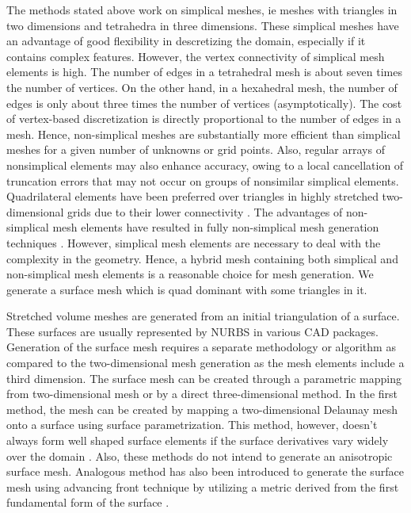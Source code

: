 \documentclass[conf]{new-aiaa}
\begin{document}
The methods stated above work on simplical meshes, ie meshes with triangles in two dimensions and tetrahedra in three dimensions. These simplical meshes have an advantage of good flexibility in descretizing the domain, especially if it contains complex features. However, the vertex connectivity of simplical mesh elements is high. The number of edges in a tetrahedral mesh is about seven times the number of vertices. On the other hand, in a hexahedral mesh, the number of edges is only about three times the number of vertices (asymptotically). The cost of vertex-based discretization is directly proportional to the number of edges in a mesh. Hence, non-simplical meshes are substantially more efficient than simplical meshes for a given number of unknowns or grid points. Also, regular arrays of nonsimplical elements may also enhance accuracy, owing to a local cancellation of truncation errors that may not occur on groups of nonsimilar simplical elements\cite{mavriplis1997unstructured}. Quadrilateral elements have been preferred over triangles in highly stretched two-dimensional grids due to their lower connectivity \cite{aftosmis1994accuracy}. The advantages of non-simplical mesh elements have resulted in fully non-simplical mesh generation techniques \cite{blacker1991paving, zhu1991new}. However, simplical mesh elements are necessary to deal with the complexity in the geometry. Hence, a hybrid mesh containing both simplical and non-simplical mesh elements is a reasonable choice for mesh generation. We generate a surface mesh which is quad dominant with some triangles in it.

Stretched volume meshes are generated from an initial triangulation of a surface. These surfaces are usually represented by NURBS in various CAD packages. Generation of the surface mesh requires a separate methodology or algorithm as compared to the two-dimensional mesh generation as the mesh elements include a third dimension. The surface mesh can be created through a parametric mapping from two-dimensional mesh or by a direct three-dimensional method. In the first method, the mesh can be created by mapping a two-dimensional Delaunay mesh onto a surface\cite{george1998delaunay, chen1997delaunay} using surface parametrization. This method, however, doesn't always form well shaped surface elements if the surface derivatives vary widely over the domain \cite{owen1998survey}. Also, these methods do not intend to generate an anisotropic surface mesh. Analogous method has also been introduced to generate the surface mesh using advancing front technique by utilizing a metric derived from the first fundamental form of the surface \cite{cuilliere1998adaptive, tristano1998advancing}.
\end{document}
